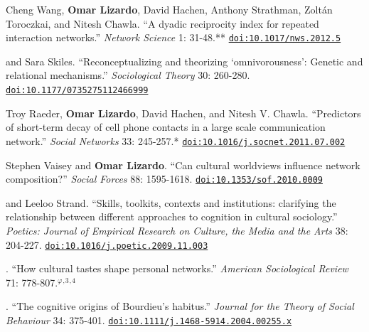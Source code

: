 \documentclass[10pt]{article}
\begin{document}
\ind Cheng Wang, {\bf Omar Lizardo}, David Hachen, Anthony Strathman, Zolt\'{a}n Toroczkai, and Nitesh Chawla. ``A dyadic reciprocity index for repeated interaction networks.'' {\em Network Science} 1: 31-48.\textcolor{uclablue}{**} \href{https://doi.org/10.1017/nws.2012.5}{\nolinkurl{doi:10.1017/nws.2012.5}}


 and Sara Skiles. ``Reconceptualizing and theorizing ‘omnivorousness’: Genetic and relational mechanisms.'' {\em Sociological Theory} 30: 260-280. \href{https://doi.org/10.1177/0735275112466999}{\nolinkurl{doi:10.1177/0735275112466999}}


\ind Troy Raeder, {\bf Omar Lizardo}, David Hachen, and Nitesh V. Chawla. ``Predictors of short-term decay of cell phone contacts in a large scale communication network.'' {\em Social Networks} 33: 245-257.\textcolor{uclablue}{*} \href{https://doi.org/10.1016/j.socnet.2011.07.002}{\nolinkurl{doi:10.1016/j.socnet.2011.07.002}}

\ind Stephen Vaisey and {\bf Omar Lizardo}. ``Can cultural worldviews influence network composition?''  {\em Social Forces} 88: 1595-1618. \href{https://doi.org/10.1353/sof.2010.0009}{\nolinkurl{doi:10.1353/sof.2010.0009}}

 and Leeloo Strand. ``Skills, toolkits, contexts and institutions: clarifying the relationship between different approaches to  cognition in cultural sociology.''  {\em Poetics: Journal of Empirical Research on Culture, the Media and the Arts} 38: 204-227. \href{https://doi.org/10.1016/j.poetic.2009.11.003}{\nolinkurl{doi:10.1016/j.poetic.2009.11.003}}

. ``How cultural tastes shape personal networks.'' {\em American Sociological Review} 71:  778-807.\textcolor{black}{$^{\varphi}$}$^{,}$\textcolor{uclablue}{$^{3}$}$^{,}$\textcolor{uclablue}{$^{4}$}

. ``The cognitive origins of Bourdieu's habitus.'' {\em Journal for the Theory of Social Behaviour} 34: 375-401. \href{https://doi.org/10.1111/j.1468-5914.2004.00255.x}{\nolinkurl{doi:10.1111/j.1468-5914.2004.00255.x}}

\bigskip
{}
    
    
    
\end{document}
